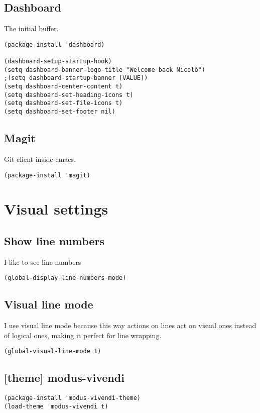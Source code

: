 \documentclass[11pt]{article}
\begin{document}
\subsection{Dashboard}
\label{sec:orgc7160e0}
The initial buffer.
\begin{verbatim}
(package-install 'dashboard)

(dashboard-setup-startup-hook)
(setq dashboard-banner-logo-title "Welcome back Nicolò")
;(setq dashboard-startup-banner [VALUE])
(setq dashboard-center-content t)
(setq dashboard-set-heading-icons t)
(setq dashboard-set-file-icons t)
(setq dashboard-set-footer nil)
\end{verbatim}

\subsection{Magit}
\label{sec:orgf881195}
Git client inside emacs.
\begin{verbatim}
(package-install 'magit)
\end{verbatim}

\section{Visual settings}
\label{sec:org6fc5b8d}
\subsection{Show line numbers}
\label{sec:org612d549}
I like to see line numbers
\begin{verbatim}
(global-display-line-numbers-mode)
\end{verbatim}

\subsection{Visual line mode}
\label{sec:org8e980aa}
I use visual line mode because this way actions on lines act on visual ones instead of logical ones, making it perfect for line wrapping.
\begin{verbatim}
(global-visual-line-mode 1)
\end{verbatim}

\subsection{[theme] modus-vivendi}
\label{sec:org8d7971b}
\begin{verbatim}
(package-install 'modus-vivendi-theme)
(load-theme 'modus-vivendi t)
\end{verbatim}
\end{document}
